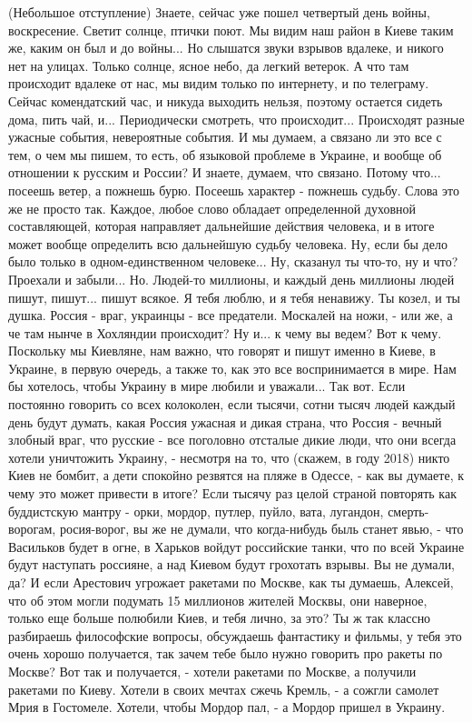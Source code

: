 (Небольшое отступление) Знаете, сейчас уже пошел четвертый день войны,
воскресение. Светит солнце, птички поют. Мы видим наш район в Киеве таким же,
каким он был и до войны...  Но слышатся звуки взрывов вдалеке, и никого нет на
улицах. Только солнце, ясное небо, да легкий ветерок.  А что там происходит
вдалеке от нас, мы видим только по интернету, и по телеграму.  Сейчас
комендатский час, и никуда выходить нельзя, поэтому остается сидеть дома, пить
чай, и...  Периодически смотреть, что происходит...  Происходят разные ужасные
события, невероятные события. И мы думаем, а связано ли это все с тем, о чем мы
пишем, то есть, об языковой проблеме в Украине, и вообще об отношении к русским
и России? И знаете, думаем, что связано. Потому что...  посеешь ветер, а
пожнешь бурю. Посеешь характер - пожнешь судьбу. Слова это же не просто так.
Каждое, любое слово обладает определенной духовной составляющей, которая
направляет дальнейшие действия человека, и в итоге может вообще определить всю
дальнейшую судьбу человека. Ну, если бы дело было только в одном-единственном
человеке... Ну, сказанул ты что-то, ну и что? Проехали и забыли... Но. Людей-то
миллионы, и каждый день миллионы людей пишут, пишут...  пишут всякое. Я тебя
люблю, и я тебя ненавижу.  Ты козел, и ты душка. Россия - враг, украинцы - все
предатели. Москалей на ножи, - или же, а че там нынче в Хохляндии происходит?
Ну и... к чему вы ведем? Вот к чему. Поскольку мы Киевляне, нам важно, что
говорят и пишут именно в Киеве, в Украине, в первую очередь, а также то, как
это все воспринимается в мире. Нам бы хотелось, чтобы Украину в мире любили и
уважали... Так вот. Если постоянно говорить со всех колоколен, если тысячи,
сотни тысяч людей каждый день будут думать, какая Россия ужасная и дикая
страна, что Россия - вечный злобный враг, что русские - все поголовно отсталые
дикие люди, что они всегда хотели уничтожить Украину, - несмотря на то, что
(скажем, в году 2018) никто Киев не бомбит, а дети спокойно резвятся на пляже в
Одессе, - как вы думаете, к чему это может привести в итоге? Если тысячу раз
целой страной повторять как буддистскую мантру - орки, мордор, путлер, пуйло,
вата, лугандон, смерть-ворогам, росия-ворог, вы же не думали, что когда-нибудь
быль станет явью, - что Васильков будет в огне, в Харьков войдут российские
танки, что по всей Украине будут наступать россияне, а над Киевом будут
грохотать взрывы. Вы не думали, да? И если Арестович угрожает ракетами по
Москве, как ты думаешь, Алексей, что об этом могли подумать 15 миллионов
жителей Москвы, они наверное, только еще больше полюбили Киев, и тебя лично, за
это? Ты ж так классно разбираешь философские вопросы, обсуждаешь фантастику и
фильмы, у тебя это очень хорошо получается, так зачем тебе было нужно говорить
про ракеты по Москве? Вот так и получается, - хотели ракетами по Москве, а
получили ракетами по Киеву. Хотели в своих мечтах сжечь Кремль, - а сожгли
самолет Мрия в Гостомеле.  Хотели, чтобы Мордор пал, - а Мордор пришел в
Украину.

